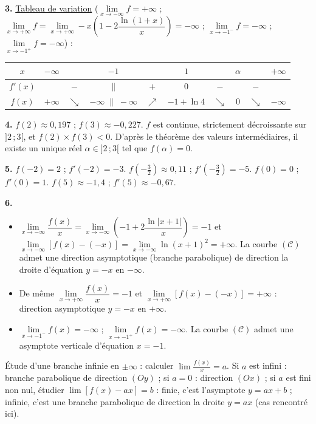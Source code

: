 \documentclass[11pt]{article}
\begin{document}
\textbf{3.} \underline{Tableau de variation} ($\lim\limits_{x\to-\infty} f = +\infty$ ; $\lim\limits_{x\to+\infty} f = \lim\limits_{x\to+\infty} -x\left(1 - 2\dfrac{\ln(1 + x)}{x}\right) = -\infty$ ; $\lim\limits_{x\to-1^-} f = -\infty$ ; $\lim\limits_{x\to-1^+} f = -\infty$) :
\begin{center}\renewcommand{\arraystretch}{1.4}
\begin{tabular}{|c|ccccccccc|}
\hline
$x$ & $-\infty$ & & $-1$ & & $1$ & & $\alpha$ & & $+\infty$ \\
\hline
$f'(x)$ & & $-$ & $\|$ & $+$ & $0$ & $-$ & & $-$ & \\
\hline
$f(x)$ & $+\infty$ & $\searrow$ & $-\infty \;\|\; -\infty$ & $\nearrow$ & $-1 + \ln 4$ & $\searrow$ & $0$ & $\searrow$ & $-\infty$ \\
\hline
\end{tabular}
\end{center}

\textbf{4.} $f(2) \approx 0{,}197$ ; $f(3) \approx -0{,}227$. $f$ est continue, strictement décroissante sur $]2\,;3[$, et $f(2) \times f(3) < 0$. D'après le théorème des valeurs intermédiaires, il existe un unique réel $\alpha \in ]2\,;3[$ tel que $f(\alpha) = 0$.

\textbf{5.} $f(-2) = 2$ ; $f'(-2) = -3$. \quad $f\left(-\tfrac{3}{2}\right) \approx 0{,}11$ ; $f'\left(-\tfrac{3}{2}\right) = -5$. \quad $f(0) = 0$ ; $f'(0) = 1$. \quad $f(5) \approx -1{,}4$ ; $f'(5) \approx -0{,}67$.

\textbf{6.}
\begin{itemize}
  \item $\lim\limits_{x\to-\infty}\dfrac{f(x)}{x} = \lim\limits_{x\to-\infty}\left(-1 + 2\dfrac{\ln|x + 1|}{x}\right) = -1$ et $\lim\limits_{x\to-\infty}[f(x) - (-x)] = \lim\limits_{x\to-\infty}\ln(x + 1)^2 = +\infty$. La courbe $(\mathscr{C})$ admet une direction asymptotique (branche parabolique) de direction la droite d'équation $y = -x$ en $-\infty$.
  \item De même $\lim\limits_{x\to+\infty}\dfrac{f(x)}{x} = -1$ et $\lim\limits_{x\to+\infty}[f(x) - (-x)] = +\infty$ : direction asymptotique $y = -x$ en $+\infty$.
  \item $\lim\limits_{x\to-1^-} f(x) = -\infty$ ; $\lim\limits_{x\to-1^+} f(x) = -\infty$. La courbe $(\mathscr{C})$ admet une asymptote verticale d'équation $x = -1$.
\end{itemize}

\begin{methode}
Étude d'une branche infinie en $\pm\infty$ : calculer
$\lim \frac{f(x)}{x} = a$. Si $a$ est infini : branche parabolique de
direction $(Oy)$ ; si $a = 0$ : direction $(Ox)$ ; si $a$ est fini non
nul, étudier $\lim [f(x) - ax] = b$ : finie, c'est l'asymptote
$y = ax + b$ ; infinie, c'est une branche parabolique de direction la
droite $y = ax$ (cas rencontré ici).
\end{methode}
\end{document}

